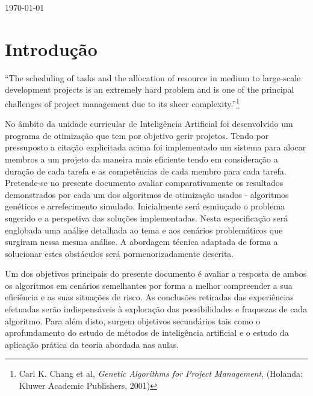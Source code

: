\begin{titlepage}

{\large \today}\\[0cm] %


\tableofcontents


\section{Introdução} 
\enquote{The scheduling of tasks and the allocation of resource in medium to large-scale development projects is an extremely hard problem and is one of the principal challenges of project management due to its sheer complexity.}\footnote{Carl K. Chang et al, \textit{Genetic Algorithms for Project Management}, (Holanda: Kluwer Academic Publishers, 2001)}

\justify\normalsize
No âmbito da unidade curricular de Inteligência Artificial foi desenvolvido um programa de otimização que tem por objetivo gerir projetos. Tendo por pressuposto a citação explicitada acima foi implementado um sistema para alocar membros a um projeto da maneira mais eficiente tendo em consideração a duração de cada tarefa e as competências de cada membro para cada tarefa. Pretende-se no presente documento avaliar comparativamente os resultados demonstrados por cada um dos algoritmos de otimização usados - algoritmos genéticos e arrefecimento simulado. Inicialmente será esmiuçado o problema sugerido e a perspetiva das soluções implementadas. Nesta especificação será englobada uma análise detalhada ao tema e aos cenários problemáticos que surgiram nessa mesma análise. A abordagem técnica adaptada de forma a solucionar estes obstáculos será pormenorizadamente descrita.

Um dos objetivos principais do presente documento é avaliar a resposta de ambos os algoritmos em cenários semelhantes por forma a melhor compreender a sua eficiência e as suas situações de risco. As conclusões retiradas das experiências efetuadas serão indispensáveis à exploração das possibilidades e fraquezas de cada algoritmo. Para além disto, surgem objetivos secundários tais como o aprofundamento do estudo de métodos de inteligência artificial e o estudo da aplicação prática da teoria abordada nas aulas.


\end{titlepage}

